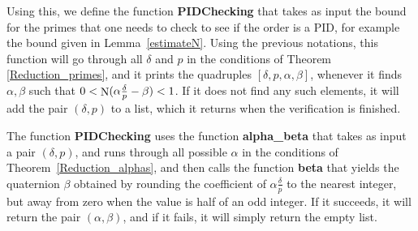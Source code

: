 \documentclass[10pt]{article}
\theoremstyle{definition}
\newcommand\N{\mathop{\rm N}\nolimits}
\begin{document}
\normalsize

Using this, we define the function \textbf{PIDChecking} that takes as
input the bound for the primes that one needs to check to see if the
order is a PID, for example the bound given in
Lemma~\ref{estimateN}. Using the previous notations, this function
will go through all $\delta$ and $p$ in the conditions of Theorem
\ref{Reduction_primes}, and it prints the quadruples
$[\delta, p, \alpha, \beta]$, whenever it finds $\alpha, \beta$ such
that $0 < \N(\alpha \frac{\delta}{p} - \beta) <1$. If it does not find
any such elements, it will add the pair $(\delta,p)$ to a list, which
it returns when the verification is finished.

The function \textbf{PIDChecking} uses the function
\textbf{alpha\_beta} that takes as input a pair $(\delta,p)$, and runs
through all possible $\alpha$ in the conditions of
Theorem~\ref{Reduction_alphas}, and then calls the function
\textbf{beta} that yields the quaternion $\beta$ obtained by rounding
the coefficient of $\alpha \frac{\delta}{p}$ to the nearest integer,
but away from zero when the value is half of an odd integer. If it
succeeds, it will return the pair $(\alpha, \beta)$, and if it fails,
it will simply return the empty list.
\end{document}
